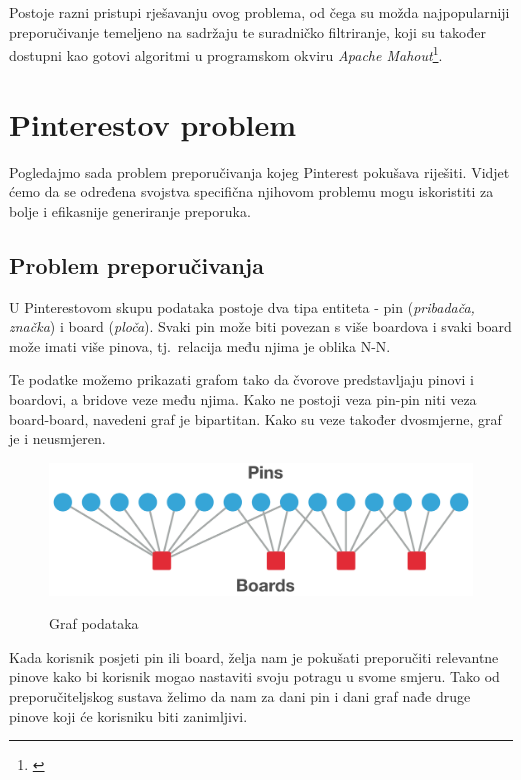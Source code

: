 \documentclass[times, utf8, seminar]{fer}
\begin{document}
Postoje razni pristupi rješavanju ovog problema, od čega su možda najpopularniji preporučivanje temeljeno na sadržaju te suradničko filtriranje, koji su također dostupni kao gotovi algoritmi u programskom okviru \textit{Apache Mahout}\footnote{\cite{rovkp-mahout}}.

\section{Pinterestov problem}

Pogledajmo sada problem preporučivanja kojeg Pinterest pokušava riješiti. Vidjet ćemo da se određena svojstva specifična njihovom problemu mogu iskoristiti za bolje i efikasnije generiranje preporuka.

\subsection{Problem preporučivanja}

U Pinterestovom skupu podataka postoje dva tipa entiteta - pin (\textit{pribadača, značka}) i board (\textit{ploča}). Svaki pin može biti povezan s više boardova i svaki board može imati više pinova, tj.\ relacija među njima je oblika N-N.

Te podatke možemo prikazati grafom tako da čvorove predstavljaju pinovi i boardovi, a bridove veze među njima. Kako ne postoji veza pin-pin niti veza board-board, navedeni graf je bipartitan. Kako su veze također dvosmjerne, graf je i neusmjeren.

\begin{figure}[h]
	\centering
	\includegraphics[width=\textwidth]{pins_boards_graph}
	\caption{Graf podataka}
	\cite{medium-article}
	\label{fig:pins_boards}
\end{figure}

Kada korisnik posjeti pin ili board, želja nam je pokušati preporučiti relevantne pinove kako bi korisnik mogao nastaviti svoju potragu u svome smjeru. Tako od preporučiteljskog sustava želimo da nam za dani pin i dani graf nađe druge pinove koji će korisniku biti zanimljivi.
\end{document}
